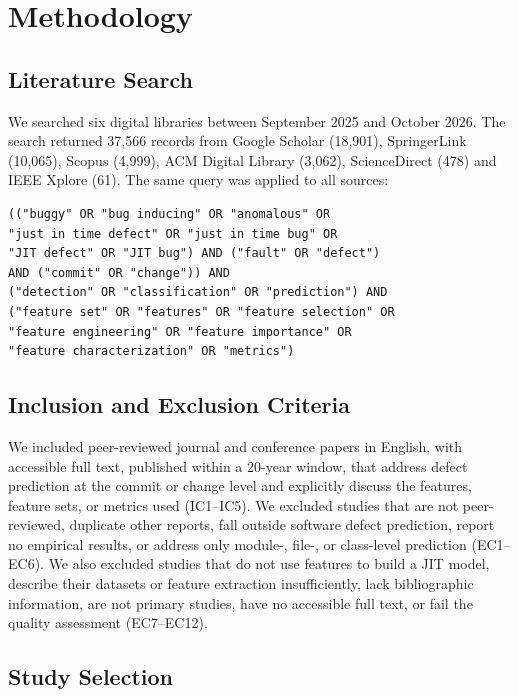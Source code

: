 \documentclass[sigconf,review]{acmart}
\begin{document}
\section{Methodology}
\label{S:methodology}

\subsection{Literature Search}
\label{subsec:literature-search}

We searched six digital libraries between September 2025 and October 2026. The search returned 37,566 records from Google Scholar (18,901), SpringerLink (10,065), Scopus (4,999), ACM Digital Library (3,062), ScienceDirect (478) and IEEE Xplore (61). The same query was applied to all sources:

{\scriptsize
\begin{verbatim}
(("buggy" OR "bug inducing" OR "anomalous" OR
"just in time defect" OR "just in time bug" OR
"JIT defect" OR "JIT bug") AND ("fault" OR "defect")
AND ("commit" OR "change")) AND
("detection" OR "classification" OR "prediction") AND
("feature set" OR "features" OR "feature selection" OR
"feature engineering" OR "feature importance" OR
"feature characterization" OR "metrics")
\end{verbatim}
}

\subsection{Inclusion and Exclusion Criteria}
\label{subsec:eligibility-criteria}

We included peer-reviewed journal and conference papers in English, with accessible full text, published within a 20-year window, that address defect prediction at the commit or change level and explicitly discuss the features, feature sets, or metrics used (IC1--IC5). We excluded studies that are not peer-reviewed, duplicate other reports, fall outside software defect prediction, report no empirical results, or address only module-, file-, or class-level prediction (EC1--EC6). We also excluded studies that do not use features to build a JIT model, describe their datasets or feature extraction insufficiently, lack bibliographic information, are not primary studies, have no accessible full text, or fail the quality assessment (EC7--EC12).

\subsection{Study Selection}
\label{subsec:study-selection}
\end{document}
